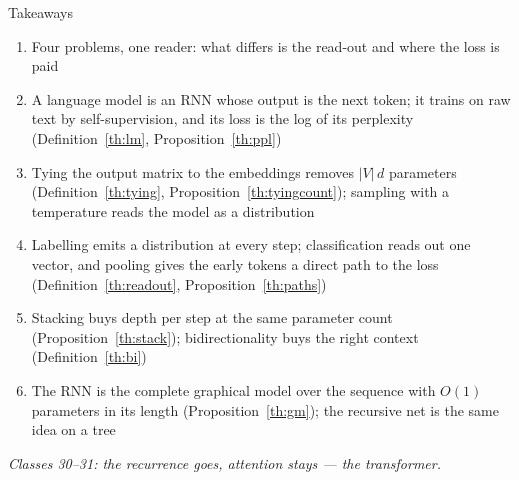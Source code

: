 \documentclass[aspectratio=169, 11pt]{beamer}
\newcommand{\bridge}[1]{%
  {\scriptsize\itshape\color{mcMuted} #1\par}\vspace{0.35em}}
\newcommand{\nosrc}{}       %
\begin{document}
\begin{frame}{Takeaways}
  \nosrc
  \vspace{-0.1em}
  {\scriptsize
  \begin{enumerate}\itemsep0.24em
    \item Four problems, one reader: what differs is the read-out and
          where the loss is paid
    \item A language model is an RNN whose output is the next token;
          it trains on raw text by self-supervision, and its loss is the
          log of its perplexity (Definition~\ref{th:lm},
          Proposition~\ref{th:ppl})
    \item Tying the output matrix to the embeddings removes $|V|\,d$
          parameters (Definition~\ref{th:tying}, Proposition~\ref{th:tyingcount});
          sampling with a temperature reads the model as a distribution
    \item Labelling emits a distribution at every step; classification
          reads out one vector, and pooling gives the early tokens a
          direct path to the loss (Definition~\ref{th:readout},
          Proposition~\ref{th:paths})
    \item Stacking buys depth per step at the same parameter count
          (Proposition~\ref{th:stack}); bidirectionality buys the right
          context (Definition~\ref{th:bi})
    \item The RNN is the complete graphical model over the sequence
          with $O(1)$ parameters in its length (Proposition~\ref{th:gm});
          the recursive net is the same idea on a tree
  \end{enumerate}}
  \vspace{-0.2em}
  \bridge{Classes 30--31: the recurrence goes, attention stays --- the transformer.}
\end{frame}
\end{document}
